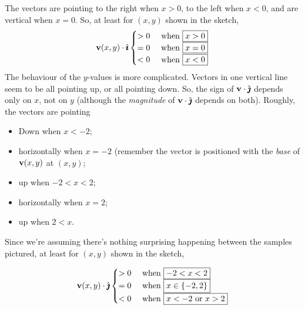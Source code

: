 \begin{solution}
The vectors are pointing to the right when $x>0$, to the left when $x<0$, and are vertical when $x=0$. So, at least for $(x,y)$ shown in the sketch,
\[\mathbf{v}(x,y)\cdot \hat{\pmb{\imath}} \begin{cases}
>0 & \mbox{ when } \fbox{$x>0$}\\
=0 &\mbox{ when } \fbox{$x=0$}\\
<0&\mbox{ when } \fbox{$x<0$}
\end{cases}\]
The behaviour of the $y$-values is more complicated. Vectors in one vertical line seem to be all pointing up, or all pointing down. So, the sign of $\mathbf{v}\cdot\hat{\pmb{\jmath}}$ depends only on $x$, not on $y$ (although the \emph{magnitude} of $\mathbf{v}\cdot\hat{\pmb{\jmath}}$ depends on both). Roughly,  the vectors are pointing
\begin{itemize}
\item Down when $x<-2$;
\item horizontally when $x=-2$ (remember the vector is positioned with the \emph{base} of $\mathbf{v}(x,y)$ at $(x,y)$;
\item up when $-2<x<2$;
\item horizontally  when $x=2$;
\item up when $2<x$.
\end{itemize}

Since we're assuming there's nothing surprising happening between the samples pictured, at least for $(x,y)$ shown in the sketch,

\[\mathbf{v}(x,y)\cdot \hat{\pmb{\jmath}} \begin{cases}
>0 & \mbox{ when } \fbox{$-2<x<2$}\\
=0 &\mbox{ when } \fbox{$x \in \{-2,2\}$}\\
<0&\mbox{ when } \fbox{$x<-2$ or $x>2$}
\end{cases}\]

\end{solution}
